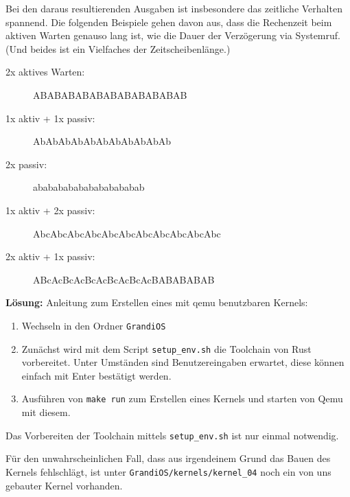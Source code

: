 \begin{description}
\begin{enumerate}
\end{enumerate}
Bei den daraus resultierenden Ausgaben ist insbesondere das zeitliche Verhalten spannend. 
Die folgenden Beispiele gehen davon aus, dass die Rechenzeit beim aktiven Warten genauso 
lang ist, wie die Dauer der Verzögerung via Systemruf. (Und beides ist ein Vielfaches der 
Zeitscheibenlänge.) 
\begin{description}
  \item[2x aktives Warten:] ABABABABABABABABABABAB 
  \item[1x aktiv + 1x passiv:] AbAbAbAbAbAbAbAbAbAbAb 
  \item[2x passiv:] ababababababababababab 
  \item[1x aktiv + 2x passiv:] AbcAbcAbcAbcAbcAbcAbcAbcAbcAbcAbc 
  \item[2x aktiv + 1x passiv:] ABcAcBcAcBcAcBcAcBcAcBABABABAB
\end{description}

\textbf{Lösung:}
Anleitung zum Erstellen eines mit qemu benutzbaren Kernels:
\begin{enumerate}
  \item Wechseln in den Ordner \texttt{GrandiOS}
  \item Zunächst wird mit dem Script \texttt{setup\_env.sh} die Toolchain von Rust vorbereitet. Unter Umständen sind Benutzereingaben erwartet, diese können einfach mit Enter bestätigt werden.
  \item Ausführen von \texttt{make run} zum Erstellen eines Kernels und starten von Qemu mit diesem.
\end{enumerate}
Das Vorbereiten der Toolchain mittels \texttt{setup\_env.sh} ist nur einmal notwendig.

Für den unwahrscheinlichen Fall, dass aus irgendeinem Grund das Bauen des Kernels fehlschlägt, ist unter {\texttt{GrandiOS/kernels/kernel\_04}} noch ein von uns gebauter Kernel vorhanden.


\end{description}
